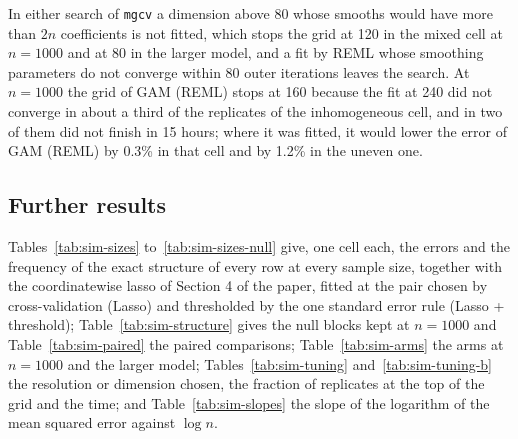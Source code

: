 In either search of \texttt{mgcv} a dimension above 80 whose smooths would
have more than $2n$ coefficients is not fitted, which stops the grid at 120 in
the mixed cell at $n = 1000$ and at 80 in the larger model, and a fit by REML
whose smoothing parameters do not converge within 80 outer iterations leaves
the search. At $n = 1000$ the grid of GAM (REML) stops at 160 because the fit
at 240 did not converge in about a third of the replicates of the
inhomogeneous cell, and in two of them did not finish in 15 hours; where it
was fitted, it would lower the error of GAM (REML) by 0.3\% in that cell and
by 1.2\% in the uneven one.

\subsection*{Further results}


Tables~\ref{tab:sim-sizes} to~\ref{tab:sim-sizes-null} give, one cell each,
the errors and the frequency of the exact structure of every row at every
sample size, together with the coordinatewise lasso of Section 4 of the
paper, fitted at the pair chosen by cross-validation (Lasso) and thresholded
by the one standard error rule (Lasso + threshold);
Table~\ref{tab:sim-structure} gives the null blocks kept at $n = 1000$ and
Table~\ref{tab:sim-paired} the paired comparisons; Table~\ref{tab:sim-arms}
the arms at $n = 1000$ and the larger model;
Tables~\ref{tab:sim-tuning} and~\ref{tab:sim-tuning-b} the resolution or
dimension chosen, the fraction of replicates at the top of the grid and the
time; and Table~\ref{tab:sim-slopes} the slope of the logarithm of the mean
squared error against $\log n$.

